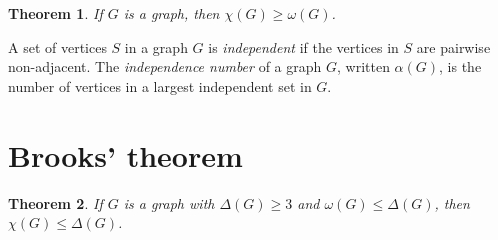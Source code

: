 \documentclass{tufte-book} %
\theoremstyle{plain}
\newtheorem{theorem}{Theorem}
\begin{document}
\begin{theorem}\label{OmegaLowerBound}
If $G$ is a graph, then $\chi(G) \ge \omega(G)$.
\end{theorem}

A set of vertices $S$ in a graph $G$ is \emph{independent} if the vertices in $S$ are pairwise non-adjacent.
The \emph{independence number} of a graph $G$, written $\alpha(G)$, is the number of vertices in a largest independent set in $G$.

\section{Brooks' theorem}
\begin{theorem}
If $G$ is a graph with $\Delta(G) \ge 3$ and $\omega(G) \le \Delta(G)$, then $\chi(G) \le \Delta(G)$.
\label{BrooksTheorem}
\end{theorem}
\end{document}
